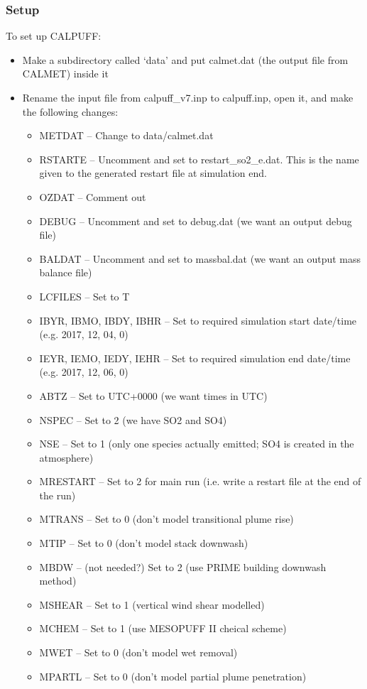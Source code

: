 \documentclass[10pt,a4paper]{article}
\begin{document}
\subsubsection{Setup}
To set up CALPUFF:
\begin{itemize}
\item Make a subdirectory called `data' and put calmet.dat (the output file from CALMET) inside it
\item Rename the input file from calpuff\_v7.inp to calpuff.inp, open it, and make the following changes:
\begin{itemize}
\item METDAT -- Change to data/calmet.dat
\item RSTARTE -- Uncomment and set to restart\_so2\_e.dat. This is the name given to the generated restart file at simulation end.
\item OZDAT -- Comment out
\item DEBUG -- Uncomment and set to debug.dat (we want an output debug file)
\item BALDAT -- Uncomment and set to massbal.dat (we want an output mass balance file)
\item LCFILES -- Set to T
\item IBYR, IBMO, IBDY, IBHR -- Set to required simulation start date/time (e.g. 2017, 12, 04, 0)
\item IEYR, IEMO, IEDY, IEHR -- Set to required simulation end date/time (e.g. 2017, 12, 06, 0)
\item ABTZ -- Set to UTC+0000 (we want times in UTC) 
\item NSPEC -- Set to 2 (we have SO2 and SO4)
\item NSE -- Set to 1 (only one species actually emitted; SO4 is created in the atmosphere)
\item MRESTART -- Set to 2 for main run (i.e. write a restart file at the end of the run)
\item MTRANS -- Set to 0 (don't model transitional plume rise)
\item MTIP -- Set to 0 (don't model stack downwash)
\item MBDW -- (not needed?) Set to 2 (use PRIME building downwash method)
\item MSHEAR -- Set to 1 (vertical wind shear modelled)
\item MCHEM -- Set to 1 (use MESOPUFF II cheical scheme)
\item MWET -- Set to 0 (don't model wet removal)
\item MPARTL -- Set to 0 (don't model partial plume penetration)

\end{itemize}
\end{itemize}
\end{document}
